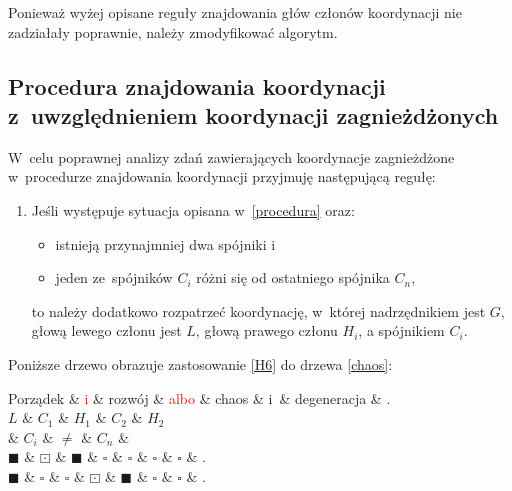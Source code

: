 Ponieważ wyżej opisane reguły znajdowania głów członów koordynacji nie zadziałały poprawnie, należy zmodyfikować algorytm.

\subsection{Procedura znajdowania koordynacji z~uwzględnieniem koordynacji zagnieżdżonych} \label{zagnieżdżone}

W~celu poprawnej analizy zdań zawierających koordynacje zagnieżdżone w~procedurze znajdowania koordynacji przyjmuję następującą regułę:

\begin{enumerate}
\item[\namedlabel{H6}{(H6)}] %
Jeśli występuje sytuacja opisana w~\eqref{procedura} oraz:

\begin{itemize}
\item istnieją przynajmniej dwa spójniki i
\item jeden ze~spójników $C_{i}$ różni się od ostatniego spójnika $C_{n}$,
\end{itemize}

to należy dodatkowo rozpatrzeć koordynację, w~której nadrzędnikiem jest $G$, głową lewego członu jest $L$, głową prawego członu $H_{i}$, a spójnikiem $C_{i}$.
\end{enumerate}

Poniższe drzewo obrazuje zastosowanie \ref{H6} do drzewa \eqref{chaos}:

\begin{exe}
\ex \label{H6-przykład}
\begin{dependency}[baseline=5.6ex]
\begin{deptext}[column sep=1em, row sep=.3ex]
Porządek \& \textcolor{red}{i} \& rozwój \& \textcolor{red}{albo} \& chaos \& i~\& degeneracja \& .  \\ 
$L$ \& $C_{1}$ \& $H_{1}$ \& $C_{2}$ \& $H_{2}$ \\
 \& $C_{i}$ \& $\neq$ \& $C_{n}$ \& \\
$\blacksquare$ \& $\boxdot$ \& $\blacksquare$ \& $\square$ \& $\square$ \& $\square$ \& $\square$ \& . \\
$\blacksquare$ \& $\square$ \& $\square$ \& $\boxdot$ \& $\blacksquare$ \& $\square$ \& $\square$ \& . \\
\end{deptext}
\end{dependency}
\end{exe}

